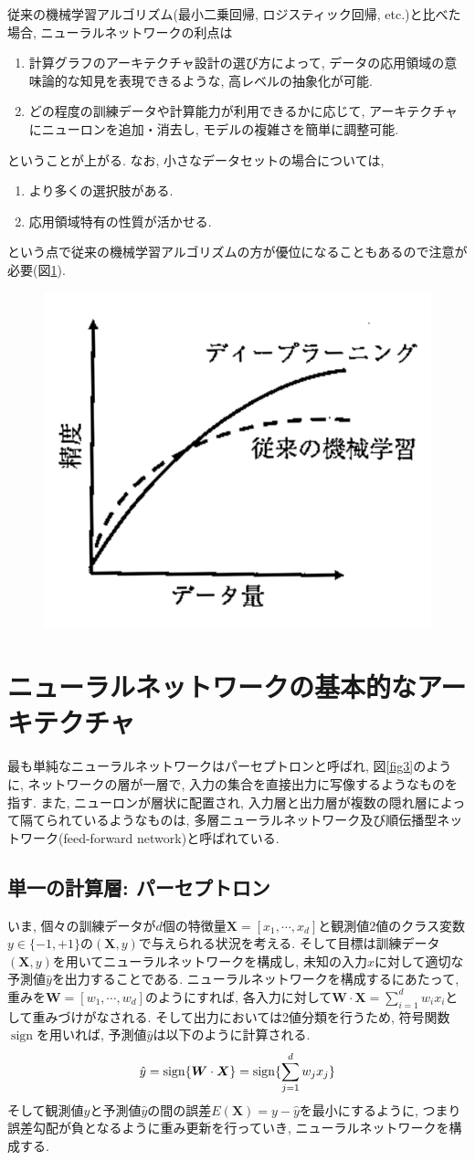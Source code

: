 \documentclass[dvipdfmx,report,11pt]{jsbook}
\begin{document}
従来の機械学習アルゴリズム(最小二乗回帰, ロジスティック回帰, etc.)と比べた場合, ニューラルネットワークの利点は
\begin{enumerate}
  \item 計算グラフのアーキテクチャ設計の選び方によって, データの応用領域の意味論的な知見を表現できるような, 高レベルの抽象化が可能.
  \item どの程度の訓練データや計算能力が利用できるかに応じて, アーキテクチャにニューロンを追加・消去し, モデルの複雑さを簡単に調整可能.
\end{enumerate}
ということが上がる. なお, 小さなデータセットの場合については, 
\begin{enumerate}
  \item より多くの選択肢がある.
  \item 応用領域特有の性質が活かせる.
\end{enumerate}
という点で従来の機械学習アルゴリズムの方が優位になることもあるので注意が必要(図\ref{fig2}).
\begin{figure}[H]
  \centering
    \includegraphics[width=0.3\linewidth]{figure/fig2.png}
    \caption{}
    \label{fig2}
\end{figure}

\section{ニューラルネットワークの基本的なアーキテクチャ}
最も単純なニューラルネットワークはパーセプトロンと呼ばれ, 図\ref{fig3}のように, ネットワークの層が一層で, 入力の集合を直接出力に写像するようなものを指す. また, ニューロンが層状に配置され, 入力層と出力層が複数の隠れ層によって隔てられているようなものは, 多層ニューラルネットワーク及び順伝播型ネットワーク(feed-forward network)と呼ばれている.


\subsection{単一の計算層: パーセプトロン}
いま, 個々の訓練データが$d$個の特徴量$\bm{X}=[x_1, \cdots, x_d]$と観測値2値のクラス変数$y\in\{-1,+1\}$の$(\bm{X},y)$で与えられる状況を考える. そして目標は訓練データ$(\bm{X},y)$を用いてニューラルネットワークを構成し, 未知の入力$x$に対して適切な予測値$\hat{y}$を出力することである. ニューラルネットワークを構成するにあたって, 重みを$\bm{W}=[w_1, \cdots, w_d]$のようにすれば, 各入力に対して$\bm{W}\cdot \bm{X}=\sum_{i=1}^d w_i x_i$として重みづけがなされる. そして出力においては2値分類を行うため, 符号関数$\operatorname{sign}$を用いれば, 予測値$\hat{y}$は以下のように計算される.
\begin{align}
  \hat{y}=\operatorname{sign}\{\bm{W}\cdot\bm{X}\}=\operatorname{sign}\{\sum_{j=1}^{d}w_jx_j\}
\end{align}
そして観測値$y$と予測値$\hat{y}$の間の誤差$E(\bm{X})=y-\hat{y}$を最小にするように, つまり誤差勾配が負となるように重み更新を行っていき, ニューラルネットワークを構成する.
\end{document}
